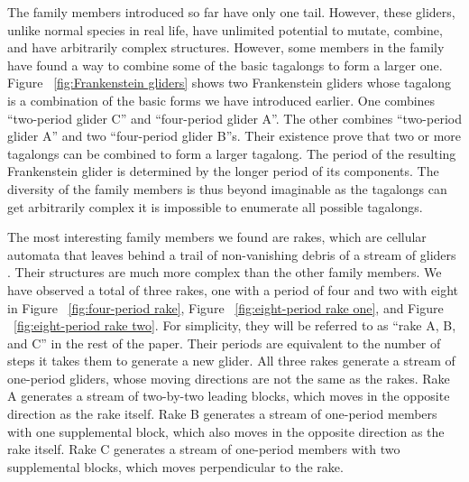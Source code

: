 \documentclass[12pt]{article}
\numberwithin{figure}{section} %
\begin{document}
The family members introduced so far have only one tail. However, these gliders, unlike normal species in real life, have unlimited potential to mutate, combine, and have arbitrarily complex structures. However, some members in the family have found a way to combine some of the basic tagalongs to form a larger one. Figure ~\ref{fig:Frankenstein gliders} shows two Frankenstein gliders whose tagalong is a combination of the basic forms we have introduced earlier. One combines “two-period glider C” and “four-period glider A”. The other combines “two-period glider A” and two “four-period glider B”s. Their existence prove that two or more tagalongs can be combined to form a larger tagalong. The period of the resulting Frankenstein glider is determined by the longer period of its components. The diversity of the family members is thus beyond imaginable as the tagalongs can get arbitrarily complex it is impossible to enumerate all possible tagalongs. 

The most interesting family members we found are rakes, which are cellular automata that leaves behind a trail of non-vanishing debris of a stream of gliders \cite{rake}. Their structures are much more complex than the other family members. We have observed a total of three rakes, one with a period of four and two with eight in Figure ~\ref{fig:four-period rake}, Figure ~\ref{fig:eight-period rake one}, and Figure ~\ref{fig:eight-period rake two}. For simplicity, they will be referred to as “rake A, B, and C” in the rest of the paper. Their periods are equivalent to the number of steps it takes them to generate a new glider. All three rakes generate a stream of one-period gliders, whose moving directions are not the same as the rakes. Rake A generates a stream of two-by-two leading blocks, which moves in the opposite direction as the rake itself. Rake B generates a stream of one-period members with one supplemental block, which also moves in the opposite direction as the rake itself. Rake C generates a stream of one-period members with two supplemental blocks, which moves perpendicular to the rake. 
\end{document}
